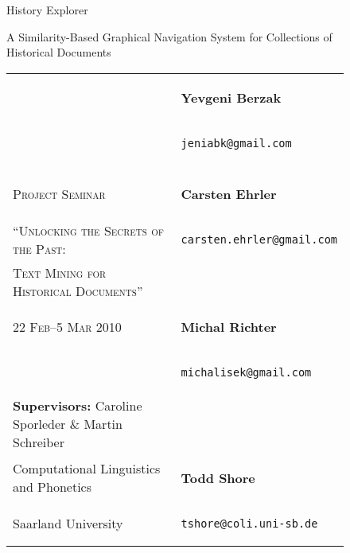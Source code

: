 \documentclass[paper=a4,draft=false,twoside]{scrartcl}
\begin{document}
\ifpdf
{}
\else
{}
\fi


\begin{titlepage}
\begin{figure}[ht]
\sc\centering
\vspace{20mm}
  \begin{Huge}
     History Explorer\\
  \end{Huge}
  \vspace{20mm}
  \begin{Large}A Similarity-Based Graphical Navigation System for Collections of Historical Documents\end{Large}
\end{figure}

	\begin{figure}[b]
    \begin{tabular}{l l}
      ~ & \begin{large}\textbf{Yevgeni Berzak}\end{large} \\
      ~ & \begin{large}\texttt{jeniabk@gmail.com} \end{large}\\
      \\
      \textsc{Project Seminar} & \begin{large}\textbf{Carsten Ehrler}\end{large} \\
       \textsc{``Unlocking the Secrets of the Past:} & \begin{large}\texttt{carsten.ehrler@gmail.com} \end{large}\\
        \textsc{Text Mining for Historical Documents''} & \\
       \textsc{22 Feb--5 Mar 2010} & \begin{large}\textbf{Michal Richter}\end{large} \\
       & \begin{large}\texttt{michalisek@gmail.com} \end{large}\\
      \textbf{Supervisors:} Caroline Sporleder \& Martin Schreiber & \\
      Computational Linguistics and Phonetics & \begin{large}\textbf{Todd Shore}\end{large} \\
      Saarland University & \begin{large}\texttt{tshore@coli.uni-sb.de} \end{large}
    \end{tabular} 
    \end{figure}
\end{titlepage}
\newpage
\thispagestyle{empty}
\hfill{}
\newpage
\end{document}
